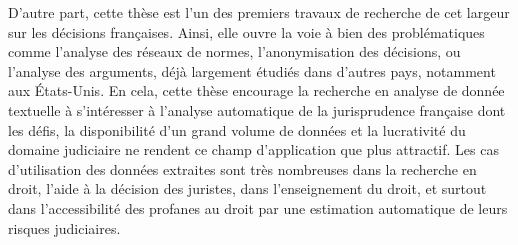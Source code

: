 D'autre part, cette thèse est l'un des premiers travaux de recherche de cet largeur sur les décisions françaises. Ainsi, elle ouvre la voie à bien des problématiques comme l'analyse des réseaux de normes, l'anonymisation des décisions, ou l'analyse des arguments, déjà largement étudiés dans d'autres pays, notamment aux États-Unis. En cela, cette thèse encourage la recherche en analyse de donnée textuelle à s'intéresser à l'analyse automatique de la jurisprudence française dont les défis, la disponibilité d'un grand volume de données et la lucrativité du domaine judiciaire ne rendent ce champ d'application que plus attractif. Les cas d'utilisation des données extraites sont très nombreuses dans la recherche en droit, l'aide à la décision des juristes, dans l'enseignement du droit, et surtout dans l'accessibilité des profanes au droit par une estimation automatique de leurs risques judiciaires.
